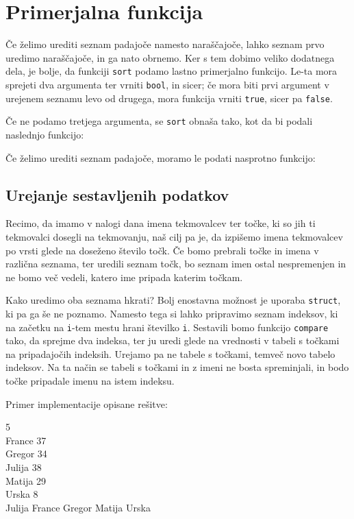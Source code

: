 \documentclass{book}
\begin{document}
\section{Primerjalna funkcija}

Če želimo urediti seznam padajoče namesto naraščajoče, lahko seznam prvo uredimo
naraščajoče, in ga nato obrnemo. Ker s tem dobimo veliko dodatnega dela, je
bolje, da funkciji \verb+sort+ podamo lastno primerjalno funkcijo. Le-ta mora
sprejeti dva argumenta ter vrniti \verb+bool+, in sicer; če mora biti prvi
argument v urejenem seznamu levo od drugega, mora funkcija vrniti \verb+true+,
sicer pa \verb+false+.

Če ne podamo tretjega argumenta, se \verb+sort+ obnaša tako, kot da bi podali
naslednjo funkcijo:


Če želimo urediti seznam padajoče, moramo le podati nasprotno funkcijo:


\subsection{Urejanje sestavljenih podatkov}

Recimo, da imamo v nalogi dana imena tekmovalcev ter točke, ki so jih ti
tekmovalci dosegli na tekmovanju, naš cilj pa je, da izpišemo imena tekmovalcev
po vrsti glede na doseženo število točk. Če bomo prebrali točke in imena v
različna seznama, ter uredili seznam točk, bo seznam imen ostal nespremenjen in
ne bomo več vedeli, katero ime pripada katerim točkam.

Kako uredimo oba seznama hkrati? Bolj enostavna možnost je uporaba \verb+struct+,
ki pa ga še ne poznamo. Namesto tega si lahko pripravimo seznam indeksov, ki
na začetku na \verb+i+-tem mestu hrani številko \verb+i+. Sestavili bomo
funkcijo \verb+compare+ tako, da sprejme dva indeksa, ter ju uredi glede na
vrednosti v tabeli s točkami na pripadajočih indeksih.
Urejamo pa ne tabele s točkami, temveč novo tabelo indeksov.
Na ta način se tabeli s točkami in z imeni ne bosta spreminjali,
in bodo točke pripadale imenu na istem indeksu.

\begin{examples}

Primer implementacije opisane rešitve:


\begin{inout}
  5 \\
  France 37 \\
  Gregor 34 \\
  Julija 38 \\
  Matija 29 \\
  Urska 8 \\
  \tcblower
  Julija
  France
  Gregor
  Matija
  Urska
\end{inout}

\end{examples}
\end{document}
